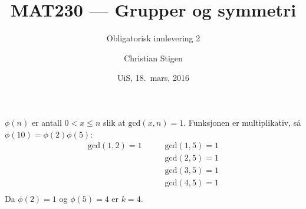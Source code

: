 \documentclass[a4paper,norsk,12pt]{article}
\title{MAT230 --- Grupper og symmetri}
\subtitle{Obligatorisk innlevering 2}
\author{Christian Stigen}
\date{UiS, 18.~mars, 2016}
\begin{document}
\maketitle


$\phi{(n)}$ er antall $0 < x \leqslant n$ slik at $\text{gcd}{(x,n)} = 1$.
Funksjonen er multiplikativ, så $\phi{(10)} = \phi{(2)}\phi{(5)}$:
\begin{align*}
  \text{gcd}(1, 2) = 1 & \qquad\text{gcd}(1, 5) = 1 \\
                       & \qquad\text{gcd}(2, 5) = 1 \\
                       & \qquad\text{gcd}(3, 5) = 1 \\
                       & \qquad\text{gcd}(4, 5) = 1 \\
\end{align*}
Da $\phi{(2)}=1$ og $\phi{(5)}=4$ er $k=4$.
\end{document}
